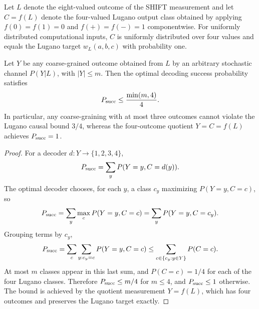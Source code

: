 \begin{proposition}
Let \(L\) denote the eight-valued outcome of the SHIFT measurement and let
\(C=f(L)\) denote the four-valued Lugano output class obtained by applying
\(f(0)=f(1)=0\) and \(f(+)=f(-)=1\) componentwise. For uniformly distributed
computational inputs, \(C\) is uniformly distributed over four values and equals
the Lugano target \(w_L(a,b,c)\) with probability one.

Let \(Y\) be any coarse-grained outcome obtained from \(L\) by an arbitrary
stochastic channel \(P(Y|L)\), with \(|Y|\le m\). Then the optimal decoding
success probability satisfies
\[
    P_{\rm succ}\le \frac{\min(m,4)}{4}.
\]
In particular, any coarse-graining with at most three outcomes cannot violate
the Lugano causal bound \(3/4\), whereas the four-outcome quotient
\(Y=C=f(L)\) achieves \(P_{\rm succ}=1\).
\end{proposition}

\begin{proof}
For a decoder \(d:Y\to\{1,2,3,4\}\),
\[
P_{\rm succ}=\sum_y P(Y=y,C=d(y)).
\]
The optimal decoder chooses, for each \(y\), a class \(c_y\) maximizing
\(P(Y=y,C=c)\), so
\[
P_{\rm succ}=\sum_y \max_c P(Y=y,C=c)
            =\sum_y P(Y=y,C=c_y).
\]
Grouping terms by \(c_y\),
\[
P_{\rm succ}
 = \sum_c \sum_{y:c_y=c} P(Y=y,C=c)
 \le \sum_{c\in\{c_y:y\in Y\}} P(C=c).
\]
At most \(m\) classes appear in this last sum, and \(P(C=c)=1/4\) for each of
the four Lugano classes. Therefore \(P_{\rm succ}\le m/4\) for \(m\le 4\),
and \(P_{\rm succ}\le 1\) otherwise. The bound is achieved by the quotient
measurement \(Y=f(L)\), which has four outcomes and preserves the Lugano
target exactly.
\end{proof}